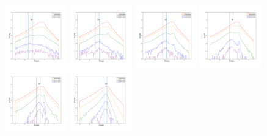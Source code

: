 \documentclass[12pt,prd]{article}
\begin{document}
\begin{figure}[h!]
\includegraphics[width=0.24\textwidth]{../figures/scanning_plotsgaiascan_l315_0_b66_4_ra197_7_dec4_0_npy_6.pdf}
\includegraphics[width=0.24\textwidth]{../figures/scanning_plotsgaiascan_l315_0_b66_4_ra197_7_dec4_0_npy_7.pdf}
\includegraphics[width=0.24\textwidth]{../figures/scanning_plotsgaiascan_l315_0_b66_4_ra197_7_dec4_0_npy_8.pdf}
\includegraphics[width=0.24\textwidth]{../figures/scanning_plotsgaiascan_l315_0_b66_4_ra197_7_dec4_0_npy_9.pdf}
\includegraphics[width=0.24\textwidth]{../figures/scanning_plotsgaiascan_l315_0_b66_4_ra197_7_dec4_0_npy_10.pdf}
\includegraphics[width=0.24\textwidth]{../figures/scanning_plotsgaiascan_l315_0_b66_4_ra197_7_dec4_0_npy_11.pdf}

\end{figure}
\end{document}

